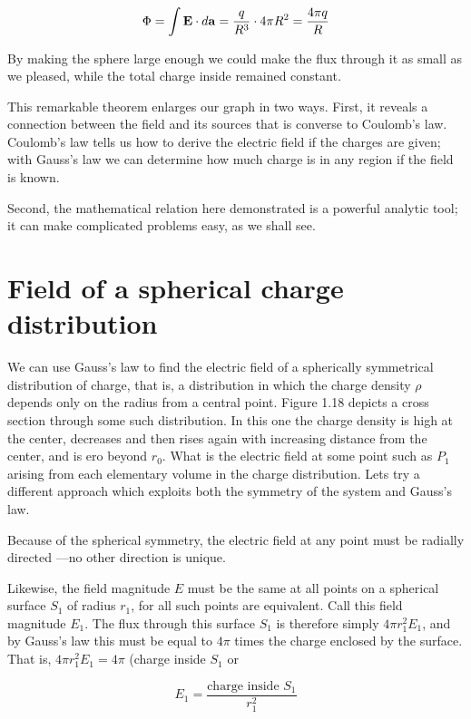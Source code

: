 \begin{equation} 
\Phi =  \mathbf{\int E} \cdot d \mathbf{a} = \frac{q}{R^3} \cdot 4 \pi R^2 =  \frac{4 \pi q}{R}
\end{equation}

By making the sphere large enough we could make the flux through it
as small as we pleased, while the total charge inside remained
constant.

This remarkable theorem enlarges our graph in two ways. First, it
reveals a connection between the field and its sources that is
converse to Coulomb's law. Coulomb's law tells us how to derive the
electric field if the charges are given; with Gauss's law we can
determine how much charge is in any region if the field is known.

Second, the mathematical relation here demonstrated is a powerful
analytic tool; it can make complicated problems easy, as we shall see.

\section{Field of a spherical charge distribution}

We can use Gauss's law to find the electric field of a spherically
symmetrical distribution of charge, that is, a distribution in which
the charge density $\rho$ depends only on the radius from a central
point. Figure 1.18 depicts a cross section through some such
distribution. In this one the charge density is high at the center,
decreases and then rises again with increasing distance from the
center, and is ero beyond $r_0$. What is the electric field at some
point such as $P_1$ arising from each elementary volume in the charge
distribution. Lets try a different approach which exploits both the
symmetry of the system and Gauss's law.

Because of the spherical symmetry, the electric field at any point
must be radially directed ---no other direction is unique.

Likewise, the field magnitude $E$ must be the same at all points on a
spherical surface $S_1$ of radius $r_1$, for all such points are
equivalent. Call this field magnitude $E_1$. The flux through this
surface $S_1$ is therefore simply $4 \pi r_1^2E_1$, and by Gauss's
law this must be equal to $4\pi$ times the charge enclosed by the
surface. That is, $4 \pi r_1^2E_1 =  4\pi$ (charge inside $S_1$ or

\begin{equation} 
  E_1 =  \frac{\text{charge inside $S_1$}}{r_1^2}
\end{equation}
